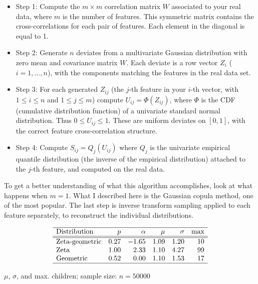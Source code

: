 \documentclass[oneside,10pt]{book}
\begin{document}
\begin{itemize}
\item Step 1: Compute the $m\times m$ correlation matrix $W$ associated to your real data, where $m$ is the number of features.
 This symmetric matrix contains the cross-correlations for each pair of features. Each element in the diagonal is equal to 1.
\item Step 2: Generate $n$ deviates from a multivariate Gaussian distribution with zero mean and covariance matrix $W$. Each deviate is a
 row vector $Z_i$ ($i=1,\dots,n$), with the components matching the features in the real data set.
\item Step 3: For each generated $Z_{ij}$ (the $j$-th feature in your $i$-th vector, with
 $1\leq i\leq n$ and $1\leq j\leq m$) compute $U_{ij}=\Phi(Z_{ij})$, where $\Phi$ is
 the CDF (cumulative distribution function) of a univariate standard normal distribution. Thus $0\leq U_{ij}\leq 1$. These
 are uniform deviates on $[0, 1]$, with the correct feature cross-correlation structure.
\item Step 4: Compute $S_{ij}=Q_j(U_{ij})$ where $Q_j$ is the univariate
\textcolor{index}{empirical quantile distribution} (the inverse of the
\textcolor{index}{empirical distribution}) attached to the $j$-th feature, and computed on the real data.
\end{itemize}\vspace{1ex}

\noindent To get a better understanding of what this algorithm accomplishes, look at what happens when $m=1$. What I described here
 is the Gaussian copula method, one of the most popular. The last step is
\textcolor{index}{inverse transform sampling} applied to each feature separately, to reconstruct the individual distributions.

\begin{table}[H]
\[
\begin{array}{lrrrrr}
\hline
\text{Distribution}	& p & \alpha	& \mu&	\sigma & \text{max}\\
\hline
\hline
 \text{Zeta-geometric} & 0.27 & -1.65 &  1.09 &  1.20 & 10\\
\text{Zeta} & 1.00 & 2.33 &   1.10 & 4.27 & 99 \\
\text{Geometric}  & 0.52 & 0.00 &  1.10 & 1.53 & 17\\
\hline
\end{array}
\]
\caption{\label{chocolat} $\mu$, $\sigma$, and max. children; sample size: $n=\num{50000}$}
\end{table}
\end{document}
